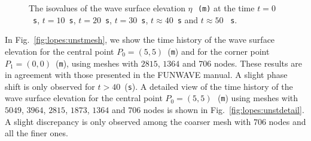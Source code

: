 \begin{figure}
{\caption{The  isovalues of the wave surface elevation
$\eta$\,~{\tt (m)}  at the time $t=0$~{\tt s},
$t=10$~{\tt s}, $t=20$~{\tt s},
 $t=30$~{\tt s}, $t\approx40$~{\tt s} and
$t\approx50$ ~{\tt s}. }\par}
\label{fig:lopes:symmetry}
\end{figure}

In Fig.~\ref{fig:lopes:unstmesh}, we show the time history of
the wave surface elevation for the central point
$P_0=(5,5)$~({\tt m}) and for the corner point
$P_1=(0,0)$~({\tt m}), using meshes with $2815$, $1364$ and
$706$ nodes.
These results are in agreement with those presented in the
FUNWAVE manual. A slight phase shift is only  observed  for
$t>40$~({\tt s}).
A detailed view of the time history of the
wave surface elevation for the central point
$P_0=(5,5)$\,~({\tt m}) using meshes with $5049$, $3964$,
$2815$, $1873$, $1364$ and $706$ nodes is shown in
Fig.~\ref{fig:lopes:unstdetail}. A slight discrepancy
is only observed  among the coarser mesh with
$706$ nodes  and all the finer ones.

